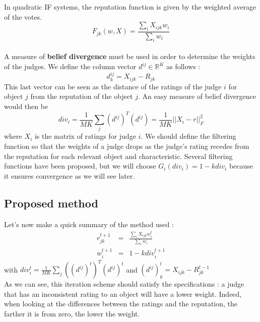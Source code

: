 \documentclass[12pt,a4paper]{article}
\begin{document}
In quadratic IF systems, the reputation function is given by the weighted average of the votes.
$$F_{jk}(w,X) = \frac{\sum_{i}X_{ijk}w_{i}}{\sum_i w_{i}}$$
\\
A measure of \textbf{belief divergence} must be used in order to determine the weights of the judges. 
We define the column vector $d^{ij} \in \mathbb{R}^K$ as follows :
$$ d^{ij}_k = X_{ijk}-R_{jk}$$
This last vector can be seen as the distance of the ratings of the judge $i$ for object $j$ from the reputation of the object $j$. An easy measure of belief divergence would then be 
$$div_i = \frac{1}{MK}\sum_{j} (d^{ij})^T (d^{ij}) = \frac{1}{MK}|| X_i - r ||_F^2$$
where $X_i$ is the matrix of ratings for judge $i$. We should define the filtering function so that the weights of a judge drops as the judge's rating recedes from the reputation for each relevant object and characteristic.
Several filtering functions have been proposed, but we will choose $G_i(div_i) = 1 - k div_i$ because it ensures convergence as we will see later.

\subsection{Proposed method}
\label{section:sub:iteration}

Let's now make a quick summary of the method used :
\begin{eqnarray}
r^{t+1}_{jk} & = & \frac{\sum_{i}X_{ijk}w^t_{i}}{\sum_i w_{i}} \label{eq:rep} \\
w^{t+1}_i & = & 1 - k div^{t+1}_i \label{eq:w8}
\end{eqnarray}
with $div^t_i =  \frac{1}{MK}\sum_{j} ((d^{ij})^t)^T (d^{ij})^t$ and $ (d^{ij})^t_k = X_{ijk}-R^{t-1}_{jk}$\\




As we can see, this iteration scheme should satisfy the specifications : a judge that has an inconsistent rating to an object will have a lower weight. Indeed, when looking at the differences between the ratings and the reputation, the farther it is from zero, the lower the weight.
\end{document}

